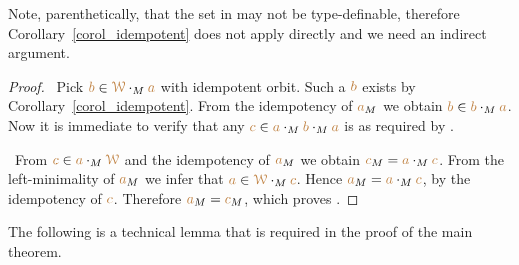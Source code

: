 \documentclass[creche.tex]{subfiles}
\begin{document}
Note, parenthetically, that the set in  may not be type-definable, 
therefore Corollary~\ref{corol_idempotent} does not apply 
directly and we need an indirect argument.

\begin{proof}  \ Pick ${\color{brown} b}\in{\color{brown}\EuScript W}\cdot_M{\color{brown} a}$ with idempotent orbit.
Such a ${\color{brown} b}$ exists by Corollary~\ref{corol_idempotent}.
From the idempotency of ${\color{brown} a}_M$ we obtain ${\color{brown} b}\in{\color{brown}b}\cdot_M{\color{brown} a}$. 
Now it is immediate to verify that any ${\color{brown} c}\in{\color{brown}a}\cdot_M{\color{brown} b}\cdot_M{\color{brown} a}$ is as required by .

 \ From ${\color{brown} c}\in{\color{brown}a}\cdot_M{\color{brown}\EuScript W}$ and the idempotency of ${\color{brown} a}_M$ 
we obtain ${\color{brown} c}_M={\color{brown} a}\cdot_M{\color{brown} c}$. 
From the left-minimality of ${\color{brown} a}_M$ we infer that ${\color{brown} a}\in{\color{brown}\EuScript W}\cdot_M{\color{brown} c}$. Hence ${\color{brown} a}_M={\color{brown} a}\cdot_M{\color{brown} c}$, by the idempotency of ${\color{brown} c}$. Therefore ${\color{brown} a}_M={\color{brown} c}_M$, which proves .
\end{proof}

The following is a technical lemma that is required in the proof of the main theorem.
\end{document}
